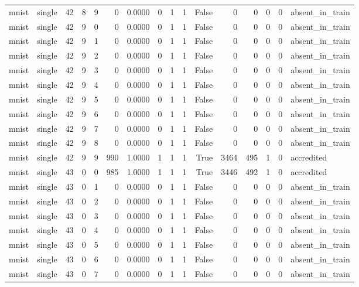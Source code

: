 \begin{tabular}{llrrrrrrrrrrrrrl}
mnist & single & 42 & 8 & 9 & 0 & 0.0000 & 0 & 1 & 1 & False & 0 & 0 & 0 & 0 & absent\_in\_train \\
mnist & single & 42 & 9 & 0 & 0 & 0.0000 & 0 & 1 & 1 & False & 0 & 0 & 0 & 0 & absent\_in\_train \\
mnist & single & 42 & 9 & 1 & 0 & 0.0000 & 0 & 1 & 1 & False & 0 & 0 & 0 & 0 & absent\_in\_train \\
mnist & single & 42 & 9 & 2 & 0 & 0.0000 & 0 & 1 & 1 & False & 0 & 0 & 0 & 0 & absent\_in\_train \\
mnist & single & 42 & 9 & 3 & 0 & 0.0000 & 0 & 1 & 1 & False & 0 & 0 & 0 & 0 & absent\_in\_train \\
mnist & single & 42 & 9 & 4 & 0 & 0.0000 & 0 & 1 & 1 & False & 0 & 0 & 0 & 0 & absent\_in\_train \\
mnist & single & 42 & 9 & 5 & 0 & 0.0000 & 0 & 1 & 1 & False & 0 & 0 & 0 & 0 & absent\_in\_train \\
mnist & single & 42 & 9 & 6 & 0 & 0.0000 & 0 & 1 & 1 & False & 0 & 0 & 0 & 0 & absent\_in\_train \\
mnist & single & 42 & 9 & 7 & 0 & 0.0000 & 0 & 1 & 1 & False & 0 & 0 & 0 & 0 & absent\_in\_train \\
mnist & single & 42 & 9 & 8 & 0 & 0.0000 & 0 & 1 & 1 & False & 0 & 0 & 0 & 0 & absent\_in\_train \\
mnist & single & 42 & 9 & 9 & 990 & 1.0000 & 1 & 1 & 1 & True & 3464 & 495 & 1 & 0 & accredited \\
mnist & single & 43 & 0 & 0 & 985 & 1.0000 & 1 & 1 & 1 & True & 3446 & 492 & 1 & 0 & accredited \\
mnist & single & 43 & 0 & 1 & 0 & 0.0000 & 0 & 1 & 1 & False & 0 & 0 & 0 & 0 & absent\_in\_train \\
mnist & single & 43 & 0 & 2 & 0 & 0.0000 & 0 & 1 & 1 & False & 0 & 0 & 0 & 0 & absent\_in\_train \\
mnist & single & 43 & 0 & 3 & 0 & 0.0000 & 0 & 1 & 1 & False & 0 & 0 & 0 & 0 & absent\_in\_train \\
mnist & single & 43 & 0 & 4 & 0 & 0.0000 & 0 & 1 & 1 & False & 0 & 0 & 0 & 0 & absent\_in\_train \\
mnist & single & 43 & 0 & 5 & 0 & 0.0000 & 0 & 1 & 1 & False & 0 & 0 & 0 & 0 & absent\_in\_train \\
mnist & single & 43 & 0 & 6 & 0 & 0.0000 & 0 & 1 & 1 & False & 0 & 0 & 0 & 0 & absent\_in\_train \\
mnist & single & 43 & 0 & 7 & 0 & 0.0000 & 0 & 1 & 1 & False & 0 & 0 & 0 & 0 & absent\_in\_train \\

\end{tabular}
